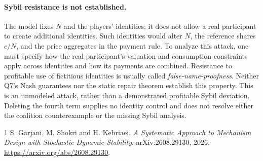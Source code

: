 \documentclass[11pt]{article}
\begin{document}
\paragraph{Sybil resistance is not established.}
The model fixes $N$ and the players' identities; it does not allow a real
participant to create additional identities. Such identities would alter
$N$, the reference shares $c/N$, and the price aggregates in the payment
rule. To analyze this attack, one must specify how the real participant's
valuation and consumption constraints apply across identities and how
its payments are combined. Resistance to profitable use of fictitious
identities is usually called \emph{false-name-proofness}.
Neither Q7's Nash guarantees nor the static repair theorem establish this
property. This is an unmodeled attack, rather than a demonstrated
profitable Sybil deviation. Deleting the fourth term supplies no identity
control and does not resolve either the coalition counterexample or the
missing Sybil analysis.

\begin{thebibliography}{1}
S. Garjani, M. Shokri and H. Kebriaei.
\emph{A Systematic Approach to Mechanism Design with Stochastic Dynamic Stability}.
arXiv:2608.29130, 2026.
\url{https://arxiv.org/abs/2608.29130}.
\end{thebibliography}
\end{document}
